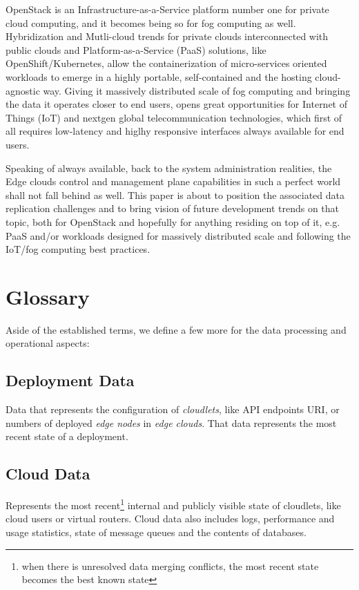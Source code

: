 \documentclass[conference]{IEEEtran}
\begin{document}
OpenStack is an Infrastructure-as-a-Service platform number one for private
cloud computing, and it becomes being so for fog computing as well.
Hybridization and Mutli-cloud trends for private clouds interconnected with
public clouds and Platform-as-a-Service (PaaS) solutions, like
OpenShift/Kubernetes, allow the containerization of micro-services oriented
workloads to emerge in a highly portable, self-contained and the hosting
cloud-agnostic way. Giving it massively distributed scale of fog computing and
bringing the data it operates closer to end users, opens great opportunities
for Internet of Things (IoT) and nextgen global telecommunication technologies,
which first of all requires low-latency and higlhy responsive interfaces always
available for end users.

Speaking of always available, back to the system administration realities, the
Edge clouds control and management plane capabilities in such a perfect world
shall not fall behind as well. This paper is about to position the associated
data replication challenges and to bring vision of future development trends on
that topic, both for OpenStack and hopefully for anything residing on top of
it, e.g. PaaS and/or workloads designed for massively distributed scale and
following the IoT/fog computing best practices.

\section{Glossary}

Aside of the established terms\cite{b3}, we define a few more for the data
processing and operational aspects:

\subsection{Deployment Data}

Data that represents the configuration of \textit{cloudlets}\cite{b3}, like
API endpoints URI, or numbers of deployed \textit{edge nodes}\cite{b3} in
\textit{edge clouds}\cite{b3}. That data represents the most recent state of a
deployment.

\subsection{Cloud Data}

Represents the most recent\footnote{when there is unresolved data merging
conflicts, the most recent state becomes the best known state} internal and
publicly visible state of cloudlets, like cloud users or virtual routers. Cloud
data also includes logs, performance and usage statistics, state of message
queues and the contents of databases.
\end{document}
